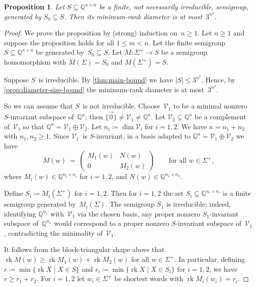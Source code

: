 \documentclass{lmcs}
\newtheorem{proposition}[thm]{Proposition}
\theoremstyle{definition}
\newcommand{\rk}{\operatorname{rk}}
\newcommand{\Q}{\mathbb{Q}}
\newcommand{\V}{\mathcal{V}}
\begin{document}
\begin{proposition} \label{prop:min-rank-diameter}
Let $S \subseteq \Q^{n \times n}$ be a finite, not necessarily irreducible, semigroup, generated by $S_0 \subseteq S$.
Then its minimum-rank diameter is at most~$3^{n^2}$.
\end{proposition}
\begin{proof}
We prove the proposition by (strong) induction on~$n \ge 1$.
Let $n \ge 1$ and suppose the proposition holds for all $1 \le m < n$.
Let the finite semigroup $S \subseteq \Q^{n \times n}$ be generated by~$S_0 \subseteq S$.
Let $M : \Sigma^+ \to S$ be a semigroup homomorphism with $M(\Sigma) = S_0$ and $M(\Sigma^+) = S$.

Suppose $S$~is irreducible.
By \cref{thm:main-bound} we have $|S| \le 3^{n^2}$.
Hence, by \cref{prop:diameter-size-bound} the minimum-rank diameter is at most~$3^{n^2}$.

So we can assume that $S$~is not irreducible.
Choose~$\V_1$ to be a minimal nonzero $S$-invariant subspace of~$\Q^n$; then $\{\vec{0}\} \ne \V_1 \ne \Q^n$.
Let $\V_2 \subseteq \Q^n$ be a complement of~$\V_1$ so that $\Q^n = \V_1 \oplus \V_2$.
Let $n_i \coloneqq \dim \V_i$ for $i=1,2$.
We have $n = n_1 + n_2$ with $n_1,n_2 \ge 1$.
Since $\V_1$~is $S$-invariant, in a basis adapted to $\Q^n = \V_1 \oplus \V_2$ we have
\[
M(w) \ = \ \begin{pmatrix} M_1(w) & N(w) \\ 0 & M_2(w) \end{pmatrix} \qquad \text{for all $w \in \Sigma^+$,}
\]
where $M_i(w) \in \Q^{n_i \times n_i}$ for $i = 1,2$, and $N(w) \in \Q^{n_1 \times n_2}$.

Define $S_i \coloneqq M_i(\Sigma^+)$ for $i=1,2$.
Then for $i=1,2$ the set $S_i \subseteq \Q^{n_i \times n_i}$ is a finite semigroup generated by~$M_i(\Sigma)$.
The semigroup $S_1$ is irreducible; indeed, identifying $\Q^{n_1}$ with~$\V_1$ via the chosen basis, any proper nonzero $S_1$-invariant subspace of~$\Q^{n_1}$ would correspond to a proper nonzero $S$-invariant subspace of~$\V_1$, contradicting the minimality of~$\V_1$.

It follows from the block-triangular shape above that $\rk M(w) \ge \rk M_1(w) + \rk M_2(w)$ for all $w \in \Sigma^+$.
In particular, defining $r \coloneqq \min\{\rk X \mid X \in S\}$ and $r_i \coloneqq \min\{\rk X \mid X \in S_i\}$ for $i=1,2$, we have $r \ge r_1 + r_2$.
For $i=1,2$ let $w_i \in \Sigma^+$ be shortest words with $\rk M_i(w_i) = r_i$.


\end{proof}
\end{document}

